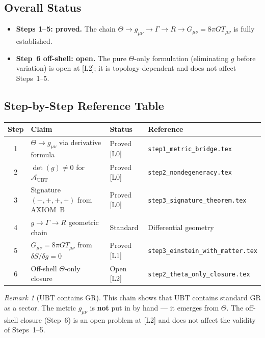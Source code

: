 \documentclass[12pt]{article}
\theoremstyle{definition}
\theoremstyle{remark}
\newtheorem{remark}[theorem]{Remark}
\begin{document}
\subsection{Overall Status}

\begin{tcolorbox}[colback=green!5!white,colframe=green!75!black,
  title=GR Recovery Status: SUBSTANTIALLY PROVED {[L1]}]

\begin{itemize}
  \item \textbf{Steps 1--5: proved.}
        The chain $\Theta \to g_{\mu\nu} \to \Gamma \to R \to G_{\mu\nu} = 8\pi G T_{\mu\nu}$
        is fully established.
  \item \textbf{Step~6 off-shell: open.}
        The pure $\Theta$-only formulation (eliminating $g$ before variation) is
        open at [L2]; it is topology-dependent and does not affect Steps~1--5.
\end{itemize}

\end{tcolorbox}

\subsection{Step-by-Step Reference Table}

\begin{center}
\begin{tabular}{clll}
\hline
\textbf{Step} & \textbf{Claim} & \textbf{Status} & \textbf{Reference} \\
\hline
1 & $\Theta \to g_{\mu\nu}$ via derivative formula & Proved [L0] & \texttt{step1\_metric\_bridge.tex} \\
2 & $\det(g) \neq 0$ for $\mathcal{A}_\mathrm{UBT}$ & Proved [L0] & \texttt{step2\_nondegeneracy.tex} \\
3 & Signature $(-,+,+,+)$ from AXIOM~B & Proved [L0] & \texttt{step3\_signature\_theorem.tex} \\
4 & $g \to \Gamma \to R$ geometric chain & Standard & Differential geometry \\
5 & $G_{\mu\nu} = 8\pi G T_{\mu\nu}$ from $\delta S/\delta g = 0$ & Proved [L1] & \texttt{step3\_einstein\_with\_matter.tex} \\
6 & Off-shell $\Theta$-only closure & Open [L2] & \texttt{step2\_theta\_only\_closure.tex} \\
\hline
\end{tabular}
\end{center}

\begin{remark}[UBT contains GR]
This chain shows that UBT contains standard GR as a sector.
The metric $g_{\mu\nu}$ is \textbf{not} put in by hand — it emerges from $\Theta$.
The off-shell closure (Step~6) is an open problem at [L2] and
does not affect the validity of Steps~1--5.
\end{remark}

\ifdefined\INCLUDEMODE
\else
  
\end{document}
